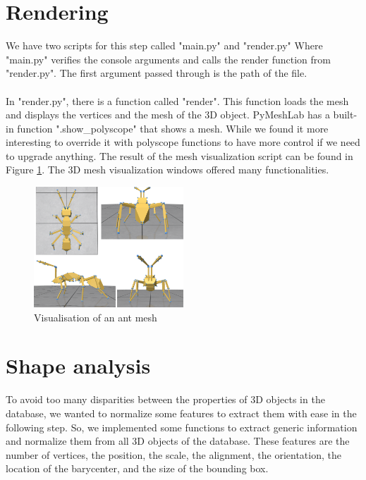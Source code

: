 \documentclass[10pt,twocolumn,letterpaper]{article}
\begin{document}
\section{Rendering}
We have two scripts for this step called "main.py" and "render.py" Where "main.py" verifies the console arguments and calls the render function from "render.py". The first argument passed through is the path of the file. \\ \\
In "render.py", there is a function called "render". This function loads the mesh and displays the vertices and the mesh of the 3D object. PyMeshLab has a built-in function ".show\_polyscope" that shows a mesh. While we found it more interesting to override it with polyscope functions to have more control if we need to upgrade anything. The result of the mesh visualization script can be found in Figure \ref{fig:ant-mesh}. The 3D mesh visualization windows offered many functionalities.

\begin{figure}[h!]
\begin{center}
  \includegraphics[width=0.5\textwidth]{picture/ant}
  \caption{Visualisation of an ant mesh}
  \label{fig:ant-mesh}
  \end{center}
\end{figure}

\section{Shape analysis}
To avoid too many disparities between the properties of 3D objects in the database, we wanted to normalize some features to extract them with ease in the following step. So, we implemented some functions to extract generic information and normalize them from all 3D objects of the database. These features are the number of vertices, the position, the scale, the alignment, the orientation, the location of the barycenter, and the size of the bounding box.
\end{document}
